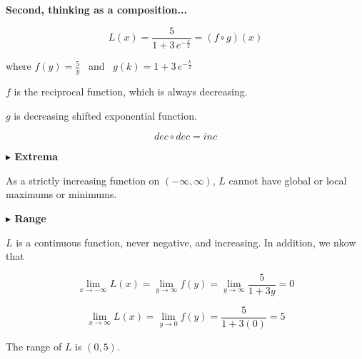 \documentclass{ximera}
\begin{document}
\begin{example}
\textbf{Second, thinking as a composition...}



\[   L(x) = \frac{5}{1 + 3 \, e^{-\tfrac{x}{2}}} = (f \circ g)(x)\]



where $f(y) =  \frac{5}{y}$  \, and  \, $g(k) = 1 + 3 \, e^{-\tfrac{k}{2}}$   

$f$ is the reciprocal function, which is always decreasing.

$g$ is decreasing shifted exponential function.


\[  dec \circ dec = inc  \]






















\textbf{\textcolor{blue!55!black}{$\blacktriangleright$ Extrema}} 


As a strictly increasing function on $(-\infty, \infty)$, $L$ cannot have global or local maximums or minimums. 










\textbf{\textcolor{blue!55!black}{$\blacktriangleright$ Range}} 



$L$ is a continuous function, never negative, and increasing. In addition, we nkow that 





\[  
\lim\limits_{x \to -\infty}L(x) = \lim\limits_{y \to \infty}f(y) = \lim\limits_{y \to \infty}\frac{5}{1 + 3 y} = 0
\]




\[  
\lim\limits_{x \to \infty}L(x) = \lim\limits_{y \to 0}f(y) = \frac{5}{1 + 3 (0)} = 5
\]








The range of $L$ is $(0, 5)$.














\end{example}
\end{document}
